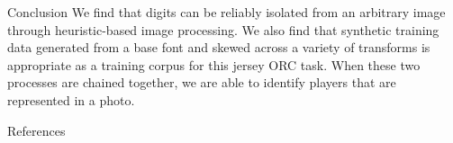 \documentclass[final]{beamer}
\newlength{\onecolwid}
\begin{document}
\begin{frame}[t]
\begin{columns}[t]
\begin{column}{\onecolwid}
\begin{block}{Conclusion}
We find that digits can be reliably isolated from an arbitrary image through heuristic-based image processing. We also find that synthetic training data generated from a base font and skewed across a variety of transforms is appropriate as a training corpus for this jersey ORC task. When these two processes are chained together, we are able to identify players that are represented in a photo. 

\end{block}


\begin{block}{References}

\nocite{*} %
\small{
\vspace{0.75in}}

\end{block}










\end{column}
\end{columns}
\end{frame}
\end{document}
